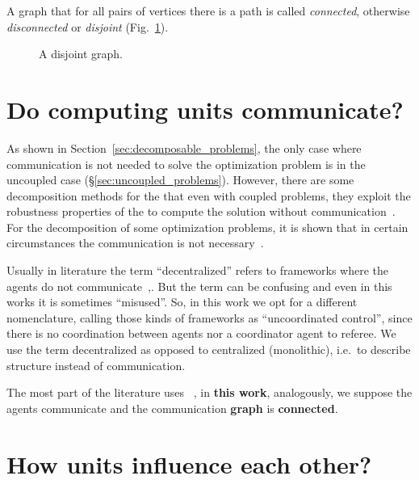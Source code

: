 \documentclass[../main.tex]{subfiles}
\begin{document}
A graph that for all pairs of vertices there is a path is called \emph{connected}, otherwise \emph{disconnected} or \emph{disjoint} (Fig.~\ref{fig:disjoint}).

\begin{figure}[h]
  \centering
  \caption{A disjoint graph.}\label{fig:disjoint}
\end{figure}

\newpage
\section{Do computing units communicate?}

As shown in Section~\ref{sec:decomposable_problems}, the only case where communication is not needed to solve the optimization problem is in the uncoupled case (\S\ref{sec:uncoupled_problems}).
However, there are some decomposition methods for the \dmpc{} that even with coupled problems, they exploit the robustness properties of the \mpc{} to compute the solution without communication~\cite{VahidNaghaviEtAl2014}.
For the decomposition of some optimization problems, it is shown that in certain circumstances the communication is not necessary~\cite{VoulgarisElia2022}.
\begin{remark}
  Usually in \dmpc{} literature the term ``decentralized'' refers to frameworks where the agents do not communicate~\cite[\S 4]{ChristofidesEtAl2013},\cite{NegenbornMaestre2014}.
  But the term can be confusing and even in this works it is sometimes ``misused''.
  So, in this work we opt for a different nomenclature, calling those kinds of frameworks as ``uncoordinated control'', since there is no coordination between agents nor a coordinator agent to referee. We use the term decentralized as opposed to centralized (monolithic), i.e.\ to describe structure instead of communication.
\end{remark}

The most part of the literature uses \emph{\coordinated}~\cite{NegenbornMaestre2014, ArauzEtAl2021}, in \textbf{this work}, analogously, we suppose the agents communicate and the communication \textbf{graph} is \textbf{connected}.

\section{How units influence each other?}
\end{document}

